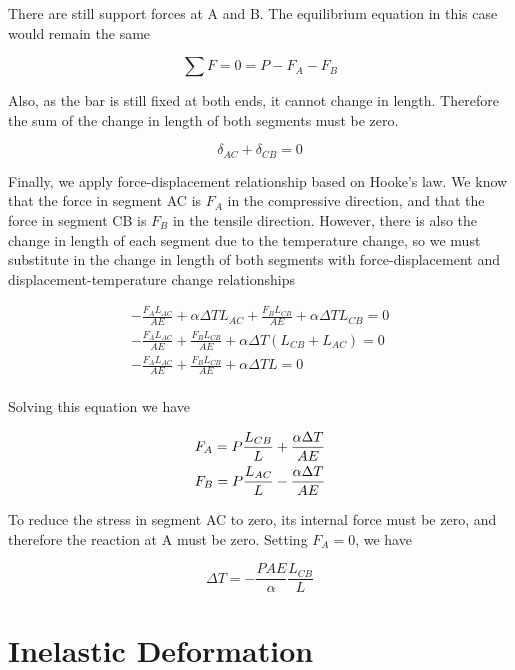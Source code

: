 \documentclass[
10pt,
a4paper,
openany,
svgnames,
]{book} %
\begin{document}
\begin{solution}

  There are still support forces at A and B. The equilibrium equation in this case would remain the same

  \[\sum F  = 0 = P - {F_A} - {F_B}\]

  Also, as the bar is still fixed at both ends, it cannot change in length. Therefore the sum of the change in length of both segments must be zero.

  \[{\delta _{AC}} + {\delta _{CB}} = 0\]	

  Finally, we apply force-displacement relationship based on Hooke’s law. We know that the force in segment AC is $F_A$ in the compressive direction, and that the force in segment CB is $F_B$ in the tensile direction. However, there is also the change in length of each segment due to the temperature change, so we must substitute in the change in length of both segments with force-displacement and displacement-temperature change relationships
  
  \[\begin{gathered}
      - \frac{{{F_A}{L_{AC}}}}{{AE}} + \alpha \Delta T{L_{AC}} + \frac{{{F_B}{L_{CB}}}}{{AE}} + \alpha \Delta T{L_{CB}} = 0 \\ 
      - \frac{{{F_A}{L_{AC}}}}{{AE}} + \frac{{{F_B}{L_{CB}}}}{{AE}} + \alpha \Delta T({L_{CB}} + {L_{AC}}) = 0 \\ 
      - \frac{{{F_A}{L_{AC}}}}{{AE}} + \frac{{{F_B}{L_{CB}}}}{{AE}} + \alpha \Delta TL = 0 \\ 
    \end{gathered} \]	
  
  Solving this equation we have
  
  \[\begin{gathered}
      {F_A} = P\frac{L_{CB}}{L} + \frac{\alpha \Delta T}{AE} \hfill \\
      {F_B} = P\frac{L_{AC}}{L} - \frac{\alpha \Delta T}{AE} \hfill \\ 
    \end{gathered} \]
  
  To reduce the stress in segment AC to zero, its internal force must be zero, and therefore the reaction at A must be zero. Setting $F_A = 0$, we have
  
  \[\Delta T =  - \frac{{PAE}}{\alpha }\frac{{{L_{CB}}}}{L}\]
  
\end{solution}

\section{Inelastic Deformation}
\end{document}
